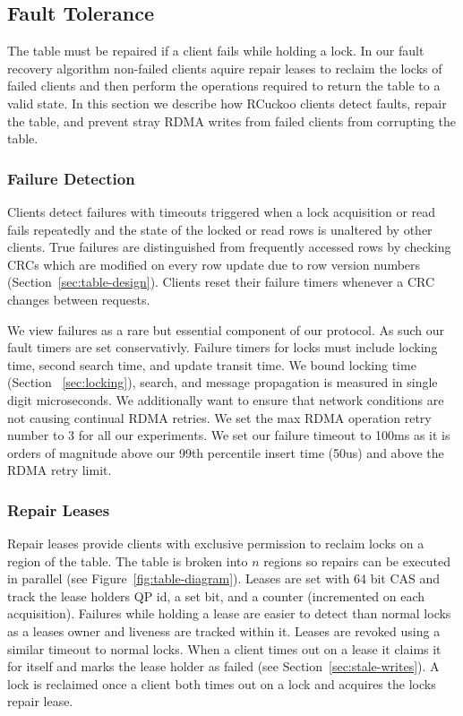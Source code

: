 \subsection{Fault Tolerance}
\label{sec:fault-tolerance}

The table must be repaired if a client fails while holding a
lock. In our fault recovery algorithm non-failed clients
aquire repair leases to reclaim the locks of failed clients
and then perform the operations required to return the table
to a valid state. In this section we describe how RCuckoo
clients detect faults, repair the table, and prevent stray
RDMA writes from failed clients from corrupting the table.

\subsubsection{Failure Detection} 

Clients detect failures with timeouts triggered when a lock
acquisition or read fails repeatedly and the state of the
locked or read rows is unaltered by other clients.  True
failures are distinguished from frequently accessed rows by
checking CRCs which are modified on every row update due to
row version numbers (Section~\ref{sec:table-design}).
Clients reset their failure timers whenever a CRC changes
between requests.


 We view failures
as a rare but essential component of our protocol. As such
our fault timers are set conservativly. Failure timers for
locks must include locking time, second search time, and
update transit time. We bound locking time (Section
~\ref{sec:locking}), search, and message propagation is
measured in single digit microseconds. We additionally want
to ensure that network conditions are not causing continual
RDMA retries. We set the max RDMA operation retry number to
3 for all our experiments. We set our failure timeout to
100ms as it is orders of magnitude above our 99th percentile
insert time (50us) and above the RDMA retry limit.


\subsubsection{Repair Leases}

Repair leases provide clients with exclusive permission to
reclaim locks on a region of the table. The table is broken
into $n$ regions so repairs can be executed in parallel (see
Figure~\ref{fig:table-diagram}). Leases are set with 64 bit
CAS and track the lease holders QP id, a set bit, and a
counter (incremented on each acquisition).  Failures while
holding a lease are easier to detect than normal locks as a
leases owner and liveness are tracked within it.  Leases are
revoked using a similar timeout to normal locks. When a
client times out on a lease it claims it for itself and
marks the lease holder as failed (see
Section~\ref{sec:stale-writes}).  A lock is reclaimed once a
client both times out on a lock and acquires the locks
repair lease. 


